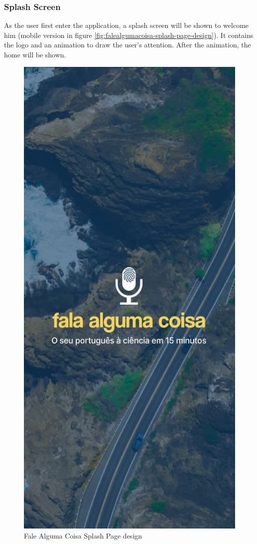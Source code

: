 \clearpage
\subsubsection{Splash Screen}

As the user first enter the application, a splash screen will be shown to welcome him (mobile version in figure \ref{fig:falealgumacoisa-splash-page-design}). It contains the logo and an animation to draw the user's attention. After the animation, the home will be shown.

\begin{figure}[ht]
    \centering
    \caption{Fale Alguma Coisa Splash Page design}
    \includegraphics[width=\linewidth/2]{images/app/m-splash.jpg}

\end{figure}
